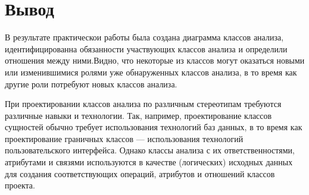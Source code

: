 \newpage

\section*{\LARGE Вывод}
В результате практическои работы была создана диаграмма классов анализа,
идентифицированна обязанности участвующих классов анализа и определили
отношения между ними.Видно,
что некоторые из классов могут оказаться новыми или изменившимися ролями
уже обнаруженных классов анализа, в то время как другие роли потребуют
новых классов анализа.\par
При проектировании классов анализа по различным стереотипам требуются
различные навыки и технологии. Так, например, проектирование классов
сущностей обычно требует использования технологий баз данных, в то время
как проектирование граничных классов — использования технологий
пользовательского интерфейса. Однако классы анализа с их ответственностями,
атрибутами и связями используются в качестве (логических) исходных данных
для создания соответствующих операций, атрибутов и отношений классов
проекта.